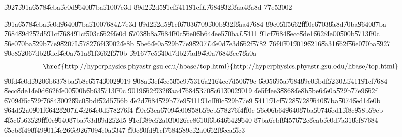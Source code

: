 \begin{case}
\U{5927}\U{591a}\U{6578}\U{4eba}\U{5c0d}\U{9640}\U{87ba}\U{5100}\U{7e3d}%
\U{89d2}\U{52d5}\U{91cf}\U{5411}\U{91cf}$L$\U{7684}\U{932f}\U{8aa4}\U{8a8d}%
\U{77e5}\U{3002}
\end{case}

\U{591a}\U{6578}\U{4eba}\U{5c0d}\U{9640}\U{87ba}\U{5100}\U{7684}$L$\U{7e3d}%
\U{89d2}\U{52d5}\U{91cf}\U{6703}\U{6709}\U{500b}\U{932f}\U{8aa4}\U{7684}%
\U{89c0}\U{5ff5}\U{662f}\U{ff0c}\U{6703}\U{8a8d}\U{70ba}\U{9640}\U{87ba}%
\U{7684}\U{89d2}\U{52d5}\U{91cf}\U{7684}\U{91cf}\U{503c}\U{662f}\U{4e0d}%
\U{6703}\U{8b8a}\U{7684}\U{ff0c}\U{56e0}\U{6b64}\U{4ee5}\U{70ba}$L$\U{5411}%
\U{91cf}\U{7684}\U{8ecc}\U{8de1}\U{662f}\U{4e00}\U{500b}\U{5713}\U{ff0c}%
\U{56e0}\U{70ba}\U{529b}\U{77e9}\U{8207}L\U{5782}\U{76f4}\U{3002}\U{4e8b}%
\U{5be6}\U{4e0a}\U{529b}\U{77e9}\U{8207}$L$\U{4e0d}\U{7e3d}\U{662f}\U{5782}%
\U{76f4}\U{ff01}\U{9019}\U{6216}\U{8a31}\U{662f}\U{56e0}\U{70ba}\U{5927}%
\U{90e8}\U{5206}\U{7db2}\U{8def}\U{4e0a}\U{751a}\U{81f3}\U{662f}\U{570b}%
\U{5916}\U{77e5}\U{540d}\U{7db2}\U{7ad9}\U{4e0a}\U{7684}\U{8cc7}\U{8a0a}%
\begin{equation*}
\text{\href{http://hyperphysics.phyastr.gsu.edu/hbase/top.html}{%
http://hyperphysics.phyastr.gsu.edu/hbase/top.html}}
\end{equation*}%
\U{90fd}\U{4e0d}\U{5920}\U{6b63}\U{78ba}\U{5b8c}\U{6574}\U{3002}\U{9019}%
\U{908a}\U{53ef}\U{4ee5}\U{85c9}\U{7531}\U{6a21}\U{64ec}\U{7d50}\U{679c}%
\U{6e05}\U{695a}\U{7684}\U{89c0}\U{5bdf}\U{5230}$L$\U{5411}\U{91cf}\U{7684}%
\U{8ecc}\U{8de1}\U{4e0d}\U{662f}\U{4e00}\U{500b}\U{6b63}\U{5713}\U{ff0c}%
\U{9019}\U{662f}\U{932f}\U{8aa4}\U{7684}\U{5370}\U{8c61}\U{3002}\U{9019}%
\U{4e5f}\U{4ee3}\U{8868}\U{4e8b}\U{5be6}\U{4e0a}\U{529b}\U{77e9}\U{662f}%
\U{6709}\U{4f5c}\U{529f}\U{7684}\U{3002}\U{89c0}\U{5bdf}\U{52d5}\U{756b}%
\U{4e2d}\U{7684}\U{529b}\U{77e9}\U{5411}\U{91cf}\U{ff0c}\U{529b}\U{77e9}%
\U{5411}\U{91cf}\U{5728}\U{5728}\U{9640}\U{87ba}\U{5074}\U{6ed1}\U{4e0b}%
\U{964d}\U{52a0}\U{901f}\U{6642}\U{8207}$L$\U{4e26}\U{4e0d}\U{5782}\U{76f4}%
\U{ff0c}\U{53ea}\U{6709}\U{4e00}\U{958b}\U{59cb}\U{5782}\U{76f4}\U{ff0c}%
\U{56e0}\U{6b64}\U{9640}\U{87ba}\U{5074}\U{6ed1}\U{5f8c}\U{958b}\U{59cb}%
\U{4f5c}\U{6b63}\U{529f}\U{ff0c}\U{9640}\U{87ba}\U{7e3d}\U{89d2}\U{52d5}%
\U{91cf}\U{589e}\U{52a0}\U{3002}\U{6ce8}\U{610f}\U{6b64}\U{6642}\U{9640}%
\U{87ba}\U{6cbf}\U{8457}\U{672c}\U{8eab}\U{5c0d}\U{7a31}\U{8ef8}\U{7684}%
\U{65cb}\U{8f49}\U{8f49}\U{901f}\U{4e26}\U{6c92}\U{6709}\U{4e0a}\U{5347}%
\U{ff0c}\U{80fd}\U{91cf}\U{7684}\U{589e}\U{52a0}\U{662f}\U{8cea}\U{5fc3}%
